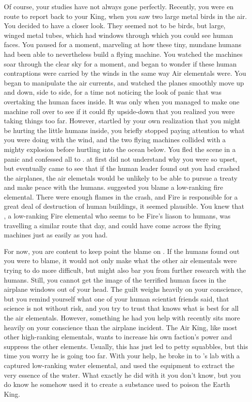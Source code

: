 \documentclass[char]{elementals}
\begin{document}
Of course, your studies have not always gone perfectly.  Recently, you were en route to report back to your King, when you saw two large metal birds in the air.  You decided to have a closer look.  They seemed not to be birds, but large, winged metal tubes, which had windows through which you could see human faces.  You paused for a moment, marveling at how these tiny, mundane humans had been able to nevertheless build a flying machine.  You watched the machines soar through the clear sky for a moment, and began to wonder if these human contraptions were carried by the winds in the same way Air elementals were.  You began to manipulate the air currents, and watched the planes smoothly move up and down, side to side, for a time not noticing the look of panic that was overtaking the human faces inside.  It was only when you managed to make one machine roll over to see if it could fly upside-down that you realized you were taking things too far.  However, startled by your own realization that you might be hurting the little humans inside, you briefly stopped paying attention to what you were doing with the wind, and the two flying machines collided with a mighty explosion before hurtling into the ocean below.  You fled the scene in a panic and confessed all to \cKing{}.  \cKing{\They} at first did not understand why you were so upset, but eventually \cKing{\they} came to see that if the human leader found out you had crashed the airplanes, the air elemetals would be unlikely to be able to pursue a treaty and make peace with the humans.  \cKing{} suggested you blame a low-ranking fire elemental.  There were enough flames in the crash, and Fire is responsible for a great deal of destruction of human buildings, it seemed plausible.  You knew that \cJuliet{\intro}, a low-ranking Fire elemental who seems to be Fire's liason to humans, was travelling a similar route that day, and could have come across the flying machines just as easily as you had.

For now, you are content to keep point the blame on \cJuliet{\them}.  If the humans found out you were to blame, it would not only make what the other air elementals were trying to do more difficult, but might also bar you from further research with the humans.  Still, you cannot get the image of the terrified human faces in the airplane windows out of your head.  The guilt weighs heavily on your conscience, but you remind yourself what one of your human scientist friends said, that science is not without risk, and you try to trust that \cKing{} knows what is best for all the air elementals.  However, something he had you help with recently sits more heavily on your conscience than the airplane incident.  The Air King, like most other high-ranking elementals, wants to increase his own faction's power and suppress the other elements.  Usually, this has just led to petty squabbles, but this time you worry he is going too far.  With your help, he broke in to \cGD{}'s lab with a captured low-ranking water elemental, and used the equipment to extract the very essence of the water.  What exactly he did with it you don't know, but you do know he somehow used it to create a substance used to poison the Earth King.  
\end{document}
